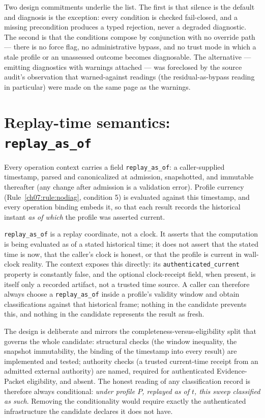 Two design commitments underlie the list. The first is that silence is the
default and diagnosis is the exception: every condition is checked
fail-closed, and a missing precondition produces a typed rejection, never a
degraded diagnostic. The second is that the conditions compose by
conjunction with no override path --- there is no force flag, no
administrative bypass, and no trust mode in which a stale profile or an
unassessed outcome becomes diagnosable. The alternative --- emitting
diagnostics with warnings attached --- was foreclosed by the source audit's
observation that warned-against readings (the residual-as-bypass reading in
particular) were made on the same page as the warnings.

\section{Replay-time semantics: \texttt{replay\_as\_of}}\label{ch07:sec:replay}

Every operation context carries a field \texttt{replay\_as\_of}: a
caller-supplied timestamp, parsed and canonicalized at admission, snapshotted,
and immutable thereafter (any change after admission is a validation error).
Profile currency (Rule~\ref{ch07:rule:nodiag}, condition 5) is evaluated
against this timestamp, and every operation binding embeds it, so that each
result records the historical instant \emph{as of which} the profile was
asserted current.

\begin{ruleenv}\label{ch07:rule:replay}
\texttt{replay\_as\_of} is a replay coordinate, not a clock. It asserts that
the computation is being evaluated as of a stated historical time; it does
not assert that the stated time is now, that the caller's clock is honest,
or that the profile is current in wall-clock reality. The context exposes
this directly: its \texttt{authenticated\_current} property is constantly
false, and the optional clock-receipt field, when present, is itself only a
recorded artifact, not a trusted time source. A caller can therefore always
choose a \texttt{replay\_as\_of} inside a profile's validity window and
obtain classifications against that historical frame; nothing in the
candidate prevents this, and nothing in the candidate represents the result
as fresh.
\end{ruleenv}

The design is deliberate and mirrors the completeness-versus-eligibility
split that governs the whole candidate: structural checks (the window
inequality, the snapshot immutability, the binding of the timestamp into
every result) are implemented and tested; authority checks (a trusted
current-time receipt from an admitted external authority) are named,
required for authenticated Evidence-Packet eligibility, and absent. The
honest reading of any classification record is therefore always
conditional: \emph{under profile $P$, replayed as of $t$, this sweep
classified as such}. Removing the conditionality would require exactly the
authenticated infrastructure the candidate declares it does not have.

